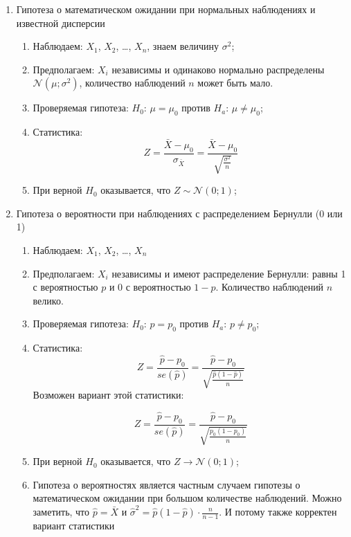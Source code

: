 \documentclass[12pt, a4paper]{article}
\newcommand{\cN}{\mathcal{N}}
\begin{document}
\begin{enumerate}
  \item Гипотеза о математическом ожидании при нормальных наблюдениях и известной дисперсии
    \begin{enumerate}

      \item Наблюдаем: $X_1$, $X_2$, \ldots, $X_n$, знаем величину $\sigma^2$;

      \item Предполагаем: $X_i$ независимы и одинаково нормально распределены $\cN(\mu; \sigma^2)$, количество наблюдений $n$ может быть мало.

      \item Проверяемая гипотеза: $H_0$: $\mu = \mu_0$ против $H_a$: $\mu \neq \mu_0$;

      \item Статистика:
	\[
	  Z = \frac{\bar X - \mu_0}{\sigma_{\bar X}} = \frac{\bar X - \mu_0}{\sqrt{\frac{\sigma^2}{n}}}
	\]

      \item При верной $H_0$ оказывается, что $Z \sim \cN(0;1)$;


    \end{enumerate}



  \item Гипотеза о вероятности при наблюдениях с распределением Бернулли (0 или 1)
  \begin{enumerate}

      \item Наблюдаем: $X_1$, $X_2$, \ldots, $X_n$

      \item Предполагаем: $X_i$ независимы и имеют распределение Бернулли: равны 1 с вероятностью $p$ и 0 с вероятностью $1-p$. Количество наблюдений $n$ велико.

      \item Проверяемая гипотеза: $H_0$: $p = p_0$ против $H_a$: $p \neq p_0$;

      \item Статистика:
	\[
	  Z = \frac{\hat p - p_0}{se(\hat p)} = \frac{\hat p - p_0}{\sqrt{\frac{\hat p (1- \hat p)}{n}}}
      \]
      Возможен вариант этой статистики:

	\[
	  Z = \frac{\hat p - p_0}{se(\hat p)} = \frac{\hat p - p_0}{\sqrt{\frac{p_0 (1- p_0 )}{n}}}
      \]


     \item При верной $H_0$ оказывается, что $Z \to \cN(0;1)$;

     \item Гипотеза о вероятностях является частным случаем гипотезы о математическом ожидании при большом количестве наблюдений. Можно заметить, что $\hat p = \bar X$ и $\hat \sigma^2 = \hat p (1- \hat p) \cdot \frac{n}{n-1}$. И потому также корректен вариант статистики


\end{enumerate}
\end{enumerate}
\end{document}
